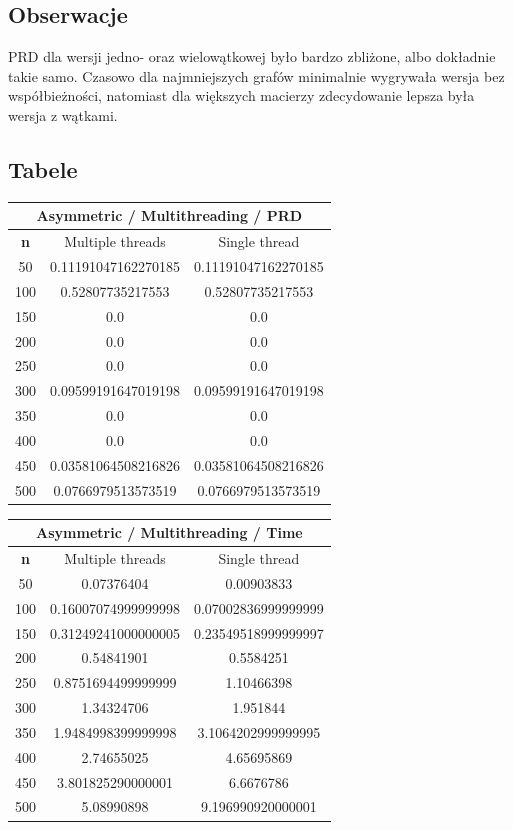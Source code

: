 \documentclass{article}
\begin{document}
\subsection{Obserwacje}

PRD dla wersji jedno- oraz wielowątkowej było bardzo zbliżone, albo dokładnie takie samo. Czasowo dla najmniejszych grafów minimalnie wygrywała wersja bez współbieżności, natomiast dla większych macierzy zdecydowanie lepsza była wersja z wątkami.

\subsection{Tabele}

\begin{center}
\begin{tabular}{|c|c|c|}
\hline
\multicolumn{3}{|c|}{\textbf{Asymmetric / Multithreading / PRD}}\\
\hline
\textbf{n} & Multiple threads & Single thread\\
\hline
50 & 0.11191047162270185 & 0.11191047162270185\\
\hline
100 & 0.52807735217553 & 0.52807735217553\\
\hline
150 & 0.0 & 0.0\\
\hline
200 & 0.0 & 0.0\\
\hline
250 & 0.0 & 0.0\\
\hline
300 & 0.09599191647019198 & 0.09599191647019198\\
\hline
350 & 0.0 & 0.0\\
\hline
400 & 0.0 & 0.0\\
\hline
450 & 0.03581064508216826 & 0.03581064508216826\\
\hline
500 & 0.0766979513573519 & 0.0766979513573519\\
\hline
\end{tabular}
\end{center}


\begin{center}
\begin{tabular}{|c|c|c|}
\hline
\multicolumn{3}{|c|}{\textbf{Asymmetric / Multithreading / Time}}\\
\hline
\textbf{n} & Multiple threads & Single thread\\
\hline
50 & 0.07376404 & 0.00903833\\
\hline
100 & 0.16007074999999998 & 0.07002836999999999\\
\hline
150 & 0.31249241000000005 & 0.23549518999999997\\
\hline
200 & 0.54841901 & 0.5584251\\
\hline
250 & 0.8751694499999999 & 1.10466398\\
\hline
300 & 1.34324706 & 1.951844\\
\hline
350 & 1.9484998399999998 & 3.1064202999999995\\
\hline
400 & 2.74655025 & 4.65695869\\
\hline
450 & 3.801825290000001 & 6.6676786\\
\hline
500 & 5.08990898 & 9.196990920000001\\
\hline
\end{tabular}
\end{center}
\end{document}
